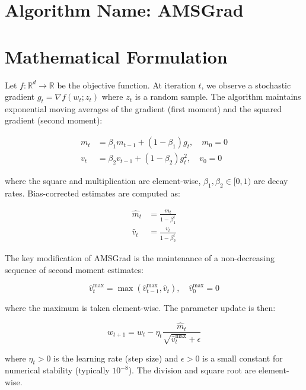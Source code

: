 \documentclass{article}
\begin{document}
\section*{Algorithm Name: AMSGrad}

\section*{Mathematical Formulation}

Let $f: \mathbb{R}^d \to \mathbb{R}$ be the objective function. At iteration $t$, we observe a stochastic gradient $g_t = \nabla f(w_t; z_t)$ where $z_t$ is a random sample. The algorithm maintains exponential moving averages of the gradient (first moment) and the squared gradient (second moment):

\begin{align}
    m_t &= \beta_1 m_{t-1} + (1 - \beta_1) g_t, \quad m_0 = 0 \label{eq:m_t} \\
    v_t &= \beta_2 v_{t-1} + (1 - \beta_2) g_t^2, \quad v_0 = 0 \label{eq:v_t}
\end{align}

where the square and multiplication are element-wise, $\beta_1, \beta_2 \in [0,1)$ are decay rates. Bias-corrected estimates are computed as:

\begin{align}
    \hat{m}_t &= \frac{m_t}{1 - \beta_1^t} \label{eq:m_hat} \\
    \hat{v}_t &= \frac{v_t}{1 - \beta_2^t} \label{eq:v_hat}
\end{align}

The key modification of AMSGrad is the maintenance of a non-decreasing sequence of second moment estimates:

\begin{equation}
    \hat{v}_t^{\text{max}} = \max(\hat{v}_{t-1}^{\text{max}}, \hat{v}_t), \quad \hat{v}_0^{\text{max}} = 0 \label{eq:v_max}
\end{equation}

where the maximum is taken element-wise. The parameter update is then:

\begin{equation}
    w_{t+1} = w_t - \eta_t \frac{\hat{m}_t}{\sqrt{\hat{v}_t^{\text{max}}} + \epsilon} \label{eq:update}
\end{equation}

where $\eta_t > 0$ is the learning rate (step size) and $\epsilon > 0$ is a small constant for numerical stability (typically $10^{-8}$). The division and square root are element-wise.
\end{document}
